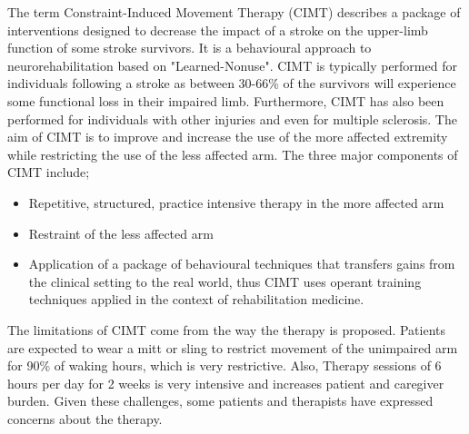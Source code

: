 \documentclass[12pt,article,oneside,a4paper]{memoir}
\begin{document}
\begin{enumerate}
The term Constraint-Induced Movement Therapy (CIMT) describes a package of
interventions designed to decrease the impact of a stroke on the upper-limb
function of some stroke survivors. It is a behavioural approach to
neurorehabilitation based on "Learned-Nonuse".
CIMT is typically performed for individuals following a stroke as between
30-66\% of the survivors will experience some functional loss in their impaired
limb. Furthermore, CIMT has also been performed for individuals with other
injuries and even for multiple sclerosis. The aim of CIMT is to improve and
increase the use of the more affected extremity while restricting the use of
the less affected arm.
The three major components of CIMT include;
\begin{itemize}
\item Repetitive, structured, practice intensive therapy in the more affected
arm
\item Restraint of the less affected arm
\item Application of a package of behavioural techniques that transfers gains
from the clinical setting to the real world, thus CIMT uses operant training
techniques applied in the context of rehabilitation medicine.
\end{itemize}

The limitations of CIMT come from the way the therapy is proposed. Patients
are expected to wear a mitt or sling to restrict movement of the unimpaired arm
for 90\% of waking hours, which is very restrictive. Also, Therapy sessions of
6 hours per day for 2 weeks is very intensive and increases patient and
caregiver burden. Given these challenges, some patients and therapists have
expressed concerns about the therapy.

\end{enumerate}
\end{document}
